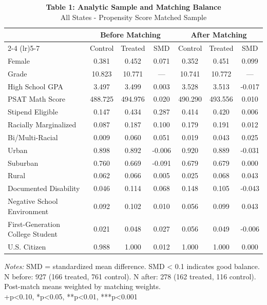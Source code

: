 \begin{table}[t]
\caption*{
{\fontsize{10}{12}\selectfont  \textbf{Table 1: Analytic Sample and Matching Balance}\fontsize{8}{10}\selectfont } \\ 
{\fontsize{8}{10}\selectfont  All States - Propensity Score Matched Sample\fontsize{8}{10}\selectfont }
} 
\fontsize{8.0pt}{10.0pt}\selectfont
\begin{tabular*}{\linewidth}{@{\extracolsep{\fill}}l|cccccc}
\toprule
 & \multicolumn{3}{c}{Before Matching} & \multicolumn{3}{c}{After Matching} \\ 
\cmidrule(lr){2-4} \cmidrule(lr){5-7}
 & Control & Treated & SMD & Control & Treated & SMD \\ 
\midrule\addlinespace[2.5pt]
Female & {0.381} & {0.452} & {0.071} & {0.352} & {0.451} & {0.099} \\ 
Grade & 10.823 & 10.771 & — & 10.741 & 10.772 & — \\ 
High School GPA & 3.497 & 3.499 & 0.003 & 3.528 & 3.513 & -0.017 \\ 
PSAT Math Score & 488.725 & 494.976 & 0.020 & 490.290 & 493.556 & 0.010 \\ 
Stipend Eligible & 0.147 & 0.434 & 0.287 & 0.414 & 0.420 & 0.006 \\ 
Racially Marginalized & 0.087 & 0.187 & 0.100 & 0.179 & 0.191 & 0.012 \\ 
Bi/Multi-Racial & 0.009 & 0.060 & 0.051 & 0.019 & 0.043 & 0.025 \\ 
Urban & 0.898 & 0.892 & -0.006 & 0.920 & 0.889 & -0.031 \\ 
Suburban & 0.760 & 0.669 & -0.091 & 0.679 & 0.679 & 0.000 \\ 
Rural & 0.062 & 0.066 & 0.005 & 0.025 & 0.068 & 0.043 \\ 
Documented Disability & 0.046 & 0.114 & 0.068 & 0.148 & 0.105 & -0.043 \\ 
Negative School Environment & 0.092 & 0.102 & 0.010 & 0.056 & 0.099 & 0.043 \\ 
First-Generation College Student & 0.021 & 0.048 & 0.027 & 0.056 & 0.049 & -0.006 \\ 
U.S. Citizen & {0.988} & {1.000} & {0.012} & {1.000} & {1.000} & {0.000} \\ 
\bottomrule
\end{tabular*}
\begin{minipage}{\linewidth}
\vspace{.05em}
\emph{Notes:} SMD = standardized mean difference. \textbar{}SMD\textbar{} \textless{} 0.1 indicates good balance. N before: 927 (166 treated, 761 control). N after: 278 (162 treated, 116 control). Post-match means weighted by matching weights.\\
+p\textless{}0.10, *p\textless{}0.05, **p\textless{}0.01, ***p\textless{}0.001\\
\end{minipage}
\end{table}

